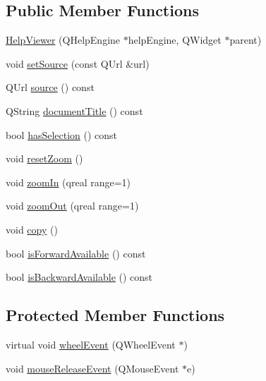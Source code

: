 \subsection*{Public Member Functions}
\begin{DoxyCompactItemize}
\item 
\hyperlink{class_help_viewer_a5a59f5f1a69dccd1db3f99557eefedff}{Help\+Viewer} (Q\+Help\+Engine $\ast$help\+Engine, Q\+Widget $\ast$parent)
\item 
void \hyperlink{class_help_viewer_a2394ee6d83fc0bcccce745a69574fe65}{set\+Source} (const Q\+Url \&url)
\item 
Q\+Url \hyperlink{class_help_viewer_af7076fdbba96daa4540bb8863df7ce64}{source} () const 
\item 
Q\+String \hyperlink{class_help_viewer_a922412cfbbf882be461c86206fdce514}{document\+Title} () const 
\item 
bool \hyperlink{class_help_viewer_a5f4b571df4b0009c0d260536dd8d5534}{has\+Selection} () const 
\item 
void \hyperlink{class_help_viewer_ad4dd2c120b87884d06d6f4d53fdd785b}{reset\+Zoom} ()
\item 
void \hyperlink{class_help_viewer_ad02962035b72b412ec429e1531963452}{zoom\+In} (qreal range=1)
\item 
void \hyperlink{class_help_viewer_aedb6f64c1eef874659ad3e71200eab6b}{zoom\+Out} (qreal range=1)
\item 
void \hyperlink{class_help_viewer_a590585128057d3990bc2f222b35ebbe4}{copy} ()
\item 
bool \hyperlink{class_help_viewer_afa96fe1757e0782110df1dd9a6d5af64}{is\+Forward\+Available} () const 
\item 
bool \hyperlink{class_help_viewer_aad885245128b1f3368406cce1b803cef}{is\+Backward\+Available} () const 
\end{DoxyCompactItemize}
\subsection*{Protected Member Functions}
\begin{DoxyCompactItemize}
\item 
virtual void \hyperlink{class_help_viewer_a700d19b911c5cfbfa691cb776a274547}{wheel\+Event} (Q\+Wheel\+Event $\ast$)
\item 
void \hyperlink{class_help_viewer_a29a0f16331e4fb8900e7670800a53002}{mouse\+Release\+Event} (Q\+Mouse\+Event $\ast$e)
\end{DoxyCompactItemize}


